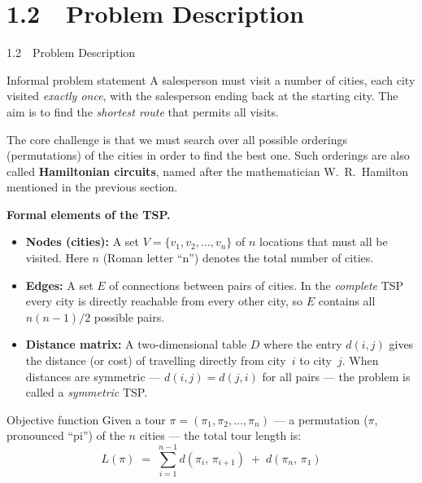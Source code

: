 \documentclass[aspectratio=169,10pt]{beamer}
\begin{document}
\section{1.2~~Problem Description}

\begin{frame}[allowframebreaks]{1.2~~Problem Description}

  \begin{block}{Informal problem statement}
    A salesperson must visit a number of cities, each city visited
    \emph{exactly once}, with the salesperson ending back at the starting
    city.  The aim is to find the \emph{shortest route} that permits all
    visits.
  \end{block}

  \medskip
  The core challenge is that we must search over all possible orderings
  (permutations) of the cities in order to find the best one.  Such
  orderings are also called \textbf{Hamiltonian circuits}, named after
  the mathematician W.~R.\ Hamilton mentioned in the previous section.

\framebreak

  \textbf{Formal elements of the TSP.}

  \begin{itemize}
    \item \textbf{Nodes (cities):} A set $V = \{v_1, v_2, \ldots, v_n\}$
      of $n$ locations that must all be visited.  Here $n$ (Roman letter
      ``n'') denotes the total number of cities.
    \item \textbf{Edges:} A set $E$ of connections between pairs of
      cities.  In the \emph{complete} TSP every city is directly
      reachable from every other city, so $E$ contains all $n(n-1)/2$
      possible pairs.
    \item \textbf{Distance matrix:} A two-dimensional table $D$ where the
      entry $d(i,j)$ gives the distance (or cost) of travelling directly
      from city~$i$ to city~$j$.  When distances are symmetric ---
      $d(i,j) = d(j,i)$ for all pairs --- the problem is called a
      \emph{symmetric} TSP.
  \end{itemize}

\framebreak

  \begin{block}{Objective function}
    Given a tour $\pi = (\pi_1, \pi_2, \ldots, \pi_n)$ --- a permutation
    ($\pi$, pronounced ``pi'') of the $n$ cities --- the total tour
    length is:
    \[
      L(\pi) \;=\;
        \sum_{i=1}^{n-1} d(\pi_i,\, \pi_{i+1})
        \;+\; d(\pi_n,\, \pi_1)
    \]
  \end{block}


\end{frame}
\end{document}
